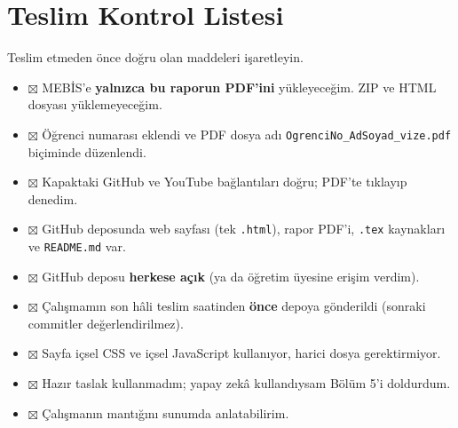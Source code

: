 \documentclass[12pt,a4paper]{article}
\begin{document}
\section{Teslim Kontrol Listesi}
Teslim etmeden önce doğru olan maddeleri işaretleyin.
\begin{itemize}
  \item $\boxtimes$ MEBİS'e \textbf{yalnızca bu raporun PDF'ini} yükleyeceğim. ZIP ve HTML dosyası yüklemeyeceğim.
  \item $\boxtimes$ Öğrenci numarası eklendi ve PDF dosya adı \texttt{OgrenciNo\_AdSoyad\_vize.pdf} biçiminde düzenlendi.
  \item $\boxtimes$ Kapaktaki GitHub ve YouTube bağlantıları doğru; PDF'te tıklayıp denedim.
  \item $\boxtimes$ GitHub deposunda web sayfası (tek \texttt{.html}), rapor PDF'i, \texttt{.tex} kaynakları ve \texttt{README.md} var.
  \item $\boxtimes$ GitHub deposu \textbf{herkese açık} (ya da öğretim üyesine erişim verdim).
  \item $\boxtimes$ Çalışmamın son hâli teslim saatinden \textbf{önce} depoya gönderildi (sonraki commitler değerlendirilmez).
  \item $\boxtimes$ Sayfa içsel CSS ve içsel JavaScript kullanıyor, harici dosya gerektirmiyor.
  \item $\boxtimes$ Hazır taslak kullanmadım; yapay zekâ kullandıysam Bölüm 5'i doldurdum.
  \item $\boxtimes$ Çalışmanın mantığını sunumda anlatabilirim.
\end{itemize}
\end{document}
